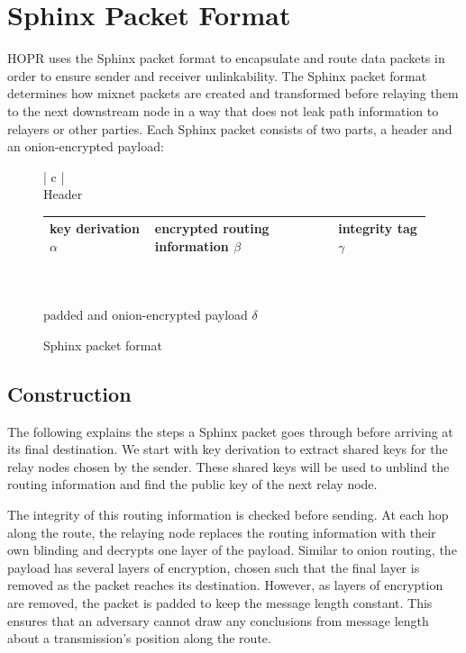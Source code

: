 \section{Sphinx Packet Format}
\label{sec:sphinx}

HOPR uses the Sphinx packet format \cite{sphinxpaper} to encapsulate and route data packets in order to ensure sender and receiver unlinkability. The Sphinx packet format determines how mixnet packets are created and transformed before relaying them to the next downstream node in a way that does not leak path information to relayers or other parties. Each Sphinx packet consists of two parts, a header and an onion-encrypted payload:

\begin{figure}[H]
    \centering
    \begin{tabular}{| c |}
        \hline
        \\[-0.8em]
        Header                                       \\[0.2em]
        \begin{tabular}{| m{} | m{} | m{} |}
            \hline
            key derivation $\alpha$ & encrypted routing information $\beta$ & integrity tag $\gamma$ \\
            \hline
        \end{tabular}                    \\[0.9em]
        \hline
        \hline
        \\[-0.7em]
        padded and onion-encrypted payload  $\delta$ \\[0.7em]
        \hline
    \end{tabular}
    \label{fig:Sphinx packet format}
    \caption{Sphinx packet format}
\end{figure}

\subsection{Construction}

The following explains the steps a Sphinx packet goes through before arriving at its final destination. We start with key derivation to extract shared keys for the relay nodes chosen by the sender. These shared keys will be used to unblind the routing information and find the public key of the next relay node.

The integrity of this routing information is checked before sending. At each hop along the route, the relaying node replaces the routing information with their own blinding and decrypts one layer of the payload. Similar to onion routing, the payload has several layers of encryption, chosen such that the final layer is removed as the packet reaches its destination. However, as layers of encryption are removed, the packet is padded to keep the message length constant. This ensures that an adversary cannot draw any conclusions from message length about a transmission's position along the route.

